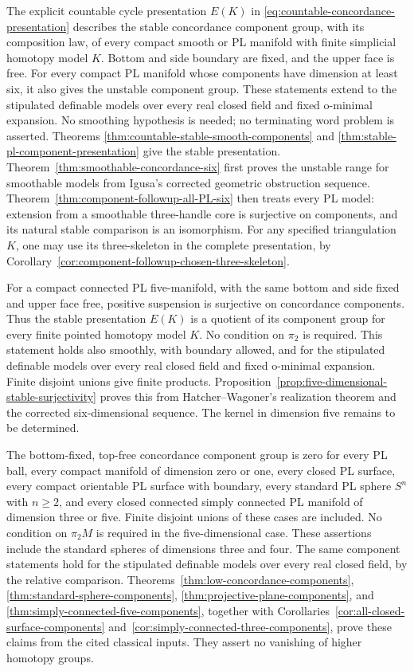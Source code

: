 \documentclass[11pt,a4paper]{article}
\theoremstyle{definition}
\begin{document}
The explicit countable cycle presentation $E(K)$ in
\eqref{eq:countable-concordance-presentation} describes the stable
concordance component group, with its composition law, of every compact
smooth or PL manifold with finite simplicial homotopy model $K$.
Bottom and side boundary are fixed, and the upper face is free.
For every compact PL manifold whose components have dimension at
least six, it also gives the unstable component group. These
statements extend to the stipulated definable models over every real
closed field and fixed o-minimal expansion. No smoothing hypothesis
is needed; no terminating word problem is asserted. Theorems
\ref{thm:countable-stable-smooth-components} and
\ref{thm:stable-pl-component-presentation} give the stable presentation.
Theorem~\ref{thm:smoothable-concordance-six} first proves the unstable
range for smoothable models from Igusa's corrected geometric
obstruction sequence. Theorem~\ref{thm:component-followup-all-PL-six}
then treats every PL model: extension from a smoothable three-handle
core is surjective on components, and its natural stable comparison
is an isomorphism. For any specified triangulation $K$, one may use
its three-skeleton in the complete presentation, by
Corollary~\ref{cor:component-followup-chosen-three-skeleton}.

For a compact connected PL five-manifold, with the same bottom and
side fixed and upper face free, positive suspension is surjective
on concordance components. Thus the stable presentation $E(K)$ is
a quotient of its component group for every finite pointed homotopy
model $K$. No condition on $\pi_2$ is required. This statement holds
also smoothly, with boundary allowed, and for the stipulated
definable models over every real closed field and fixed o-minimal
expansion. Finite disjoint unions give finite products.
Proposition~\ref{prop:five-dimensional-stable-surjectivity} proves
this from Hatcher--Wagoner's realization theorem and the corrected
six-dimensional sequence. The kernel in dimension five remains
to be determined.



The bottom-fixed, top-free concordance component group is zero
for every PL ball, every compact manifold of dimension zero or one,
every closed PL surface, every compact orientable PL surface with
boundary, every standard PL sphere $S^n$ with $n\geq2$, and every
closed connected simply connected PL manifold of dimension three
or five. Finite disjoint unions of these cases are included. No condition on
$\pi_2M$ is required in the five-dimensional case. These assertions
include the standard spheres of dimensions three and four. The same
component statements hold for the stipulated definable models over
every real closed field, by the relative comparison.
Theorems~\ref{thm:low-concordance-components},
\ref{thm:standard-sphere-components},
\ref{thm:projective-plane-components}, and
\ref{thm:simply-connected-five-components}, together with
Corollaries~\ref{cor:all-closed-surface-components}
and~\ref{cor:simply-connected-three-components}, prove these
claims from the cited classical inputs. They assert no vanishing of
higher homotopy groups.
\end{document}
